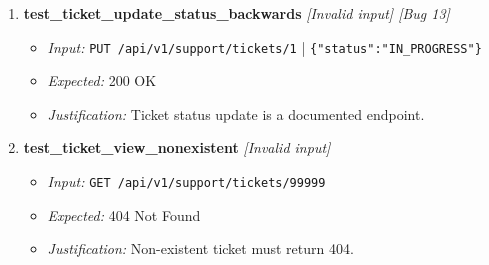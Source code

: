 \documentclass{article}
\begin{document}
\begin{enumerate}[resume, label=\textbf{TC\arabic*.}]
\item \textbf{test\_ticket\_update\_status\_backwards} \textit{[Invalid input] \textit{[Bug 13]}}
\begin{itemize}[noitemsep]
  \item \textit{Input:} \texttt{PUT /api/v1/support/tickets/1} | \texttt{\{"status":"IN\_PROGRESS"\}}
  \item \textit{Expected:} 200 OK
  \item \textit{Justification:} Ticket status update is a documented endpoint.
\end{itemize}

\item \textbf{test\_ticket\_view\_nonexistent} \textit{[Invalid input]}
\begin{itemize}[noitemsep]
  \item \textit{Input:} \texttt{GET /api/v1/support/tickets/99999}
  \item \textit{Expected:} 404 Not Found
  \item \textit{Justification:} Non-existent ticket must return 404.
\end{itemize}
\end{enumerate}
\end{document}
